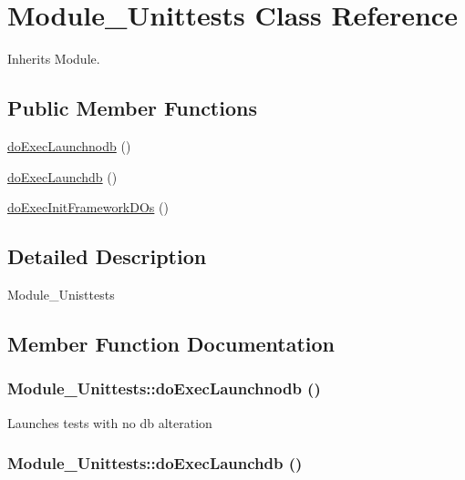 \hypertarget{classModule__Unittests}{
\section{Module\_\-Unittests Class Reference}
\label{classModule__Unittests}
}
Inherits Module.

\subsection*{Public Member Functions}
\begin{CompactItemize}
\item 
\hyperlink{classModule__Unittests_f455f450421da27ea3058682f52ba323}{doExecLaunchnodb} ()
\item 
\hyperlink{classModule__Unittests_d52693ed7860e5b25fb02977902be3ed}{doExecLaunchdb} ()
\item 
\hyperlink{classModule__Unittests_d5b0623b842be1ab385acbd44627dce1}{doExecInitFrameworkDOs} ()
\end{CompactItemize}


\subsection{Detailed Description}
Module\_\-Unisttests 

\subsection{Member Function Documentation}
\hypertarget{classModule__Unittests_f455f450421da27ea3058682f52ba323}{
\subsubsection[doExecLaunchnodb]{\setlength{\rightskip}{0pt plus 5cm}Module\_\-Unittests::doExecLaunchnodb ()}}
\label{classModule__Unittests_f455f450421da27ea3058682f52ba323}


Launches tests with no db alteration \hypertarget{classModule__Unittests_d52693ed7860e5b25fb02977902be3ed}{
\subsubsection[doExecLaunchdb]{\setlength{\rightskip}{0pt plus 5cm}Module\_\-Unittests::doExecLaunchdb ()}}
\label{classModule__Unittests_d52693ed7860e5b25fb02977902be3ed}


